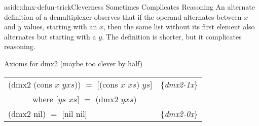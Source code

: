 \begin{aside}{aside:dmx-defun-trick}{Cleverness Sometimes Complicates Reasoning}
An alternate definition of a demultiplexer
observes that if the operand alternates between $x$ and $y$ values,
starting with an $x$,
then the same list without its first element also alternates
but starting with a $y$. The definition is shorter,
but it complicates reasoning.
\begin{center}
Axioms for \textsf{dmx2} (maybe too clever by half)
\begin{tabular}{ll}
\textsf{(dmx2 (cons $x$ $yxs$)) $=$ [(cons $x$ $xs$) $ys$]}& \{\emph{dmx2-1x}\} \\
~~~~~~where \textsf{[$ys$ $xs$] $=$ (dmx2 $yxs$)}          & \\
\textsf{(dmx2 nil) $=$ [nil nil] }                         & \{\emph{dmx2-0x}\} \\
\end{tabular}
\end{center}
\end{aside}

